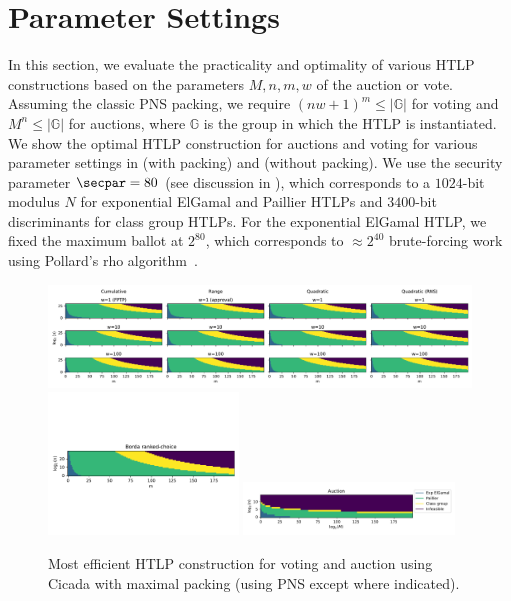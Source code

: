 \section{Parameter Settings}\label{sec:htlp-choice}

In this section, we evaluate the practicality and optimality of various HTLP constructions based on the parameters $M,n,m,w$ of the auction or vote. 
Assuming the classic PNS packing, we require $(nw+1)^m\leq\vert\mathbb{G}\vert$ for voting and $M^n\leq\vert\mathbb{G}\vert$ for auctions, where $\mathbb{G}$ is the group in which the HTLP is instantiated.
We show the optimal HTLP construction for auctions and voting for various parameter settings in  (with packing) and  (without packing). We use the security parameter $\secpar=80$ (see discussion in ), which corresponds to a $1024$-bit modulus $N$ for exponential ElGamal and Paillier HTLPs and $3400$-bit discriminants for class group HTLPs. For the exponential ElGamal HTLP, we fixed the maximum ballot at $2^{80}$, which corresponds to $\approx 2^{40}$ brute-forcing work using Pollard's rho algorithm~\cite{Pollard78}.

\begin{figure}[tb!]
    \centering
    \includegraphics[width=\textwidth]{cicada/figs/params/pack_crq.pdf}
    \centering  \includegraphics[width=0.45\textwidth,trim={0cm 3cm 0cm 4.5cm},clip]{cicada/figs/params/pack_borda.pdf}  \includegraphics[width=0.5\textwidth,trim={0cm -1cm 0cm 4.5cm}]{cicada/figs/params/pack_auction.pdf}
    \caption{Most efficient HTLP construction for voting and auction using Cicada with maximal packing (using PNS except where indicated).}
    \label{fig:packed_feasibility}
\end{figure}

